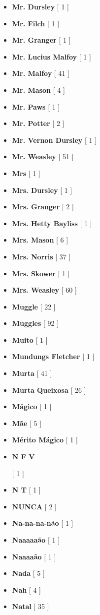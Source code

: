 \documentclass[a4paper]{article}
\begin{document}
{\begin{itemize}
	\item \textbf{Mr. Dursley} [ 1 ]
	\item \textbf{Mr. Filch} [ 1 ]
	\item \textbf{Mr. Granger} [ 1 ]
	\item \textbf{Mr. Lucius Malfoy} [ 1 ]
	\item \textbf{Mr. Malfoy} [ 41 ]
	\item \textbf{Mr. Mason} [ 4 ]
	\item \textbf{Mr. Paws} [ 1 ]
	\item \textbf{Mr. Potter} [ 2 ]
	\item \textbf{Mr. Vernon Dursley} [ 1 ]
	\item \textbf{Mr. Weasley} [ 51 ]
	\item \textbf{Mrs} [ 1 ]
	\item \textbf{Mrs. Dursley} [ 1 ]
	\item \textbf{Mrs. Granger} [ 2 ]
	\item \textbf{Mrs. Hetty Bayliss} [ 1 ]
	\item \textbf{Mrs. Mason} [ 6 ]
	\item \textbf{Mrs. Norris} [ 37 ]
	\item \textbf{Mrs. Skower} [ 1 ]
	\item \textbf{Mrs. Weasley} [ 60 ]
	\item \textbf{Muggle} [ 22 ]
	\item \textbf{Muggles} [ 92 ]
	\item \textbf{Muito} [ 1 ]
	\item \textbf{Mundungs Fletcher} [ 1 ]
	\item \textbf{Murta} [ 41 ]
	\item \textbf{Murta Queixosa} [ 26 ]
	\item \textbf{Mágico} [ 1 ]
	\item \textbf{Mãe} [ 5 ]
	\item \textbf{Mérito Mágico} [ 1 ]
	\item \hypertarget{N}{\textbf{N F V}} [ 1 ]
	\item \textbf{N T} [ 1 ]
	\item \textbf{NUNCA} [ 2 ]
	\item \textbf{Na-na-na-não} [ 1 ]
	\item \textbf{Naaaaaão} [ 1 ]
	\item \textbf{Naaaaão} [ 1 ]
	\item \textbf{Nada} [ 5 ]
	\item \textbf{Nah} [ 4 ]
	\item \textbf{Natal} [ 35 ]

\end{itemize}}
\end{document}
